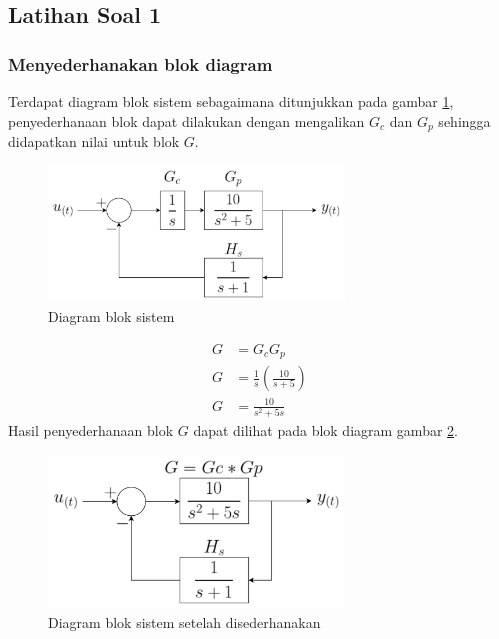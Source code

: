 \documentclass[../cover.tex]{subfiles}
\begin{document}
    \subsection{Latihan Soal 1}
        \subsubsection{Menyederhanakan blok diagram}
        Terdapat diagram blok sistem sebagaimana ditunjukkan pada gambar \ref{gambar_1}, penyederhanaan blok dapat dilakukan dengan mengalikan $G_c$ dan $G_p$ sehingga didapatkan nilai untuk blok $G$.
            \begin{figure}[H]
                \centering
                \includegraphics[width = 0.7\textwidth]{assets/image/blokDiagram.png}
                \caption{Diagram blok sistem}
                \label{gambar_1}
            \end{figure}
            \begin{equation}
                \begin{split}
                    G &= G_c    G_p \\[5pt]
                    G &= \frac{1}{s} \left(\frac{10}{s+5}\right) \\[5pt]
                    G &= \frac{10}{s^2+5s}
                    \label{persamaan_8}
                \end{split}
            \end{equation}
            Hasil penyederhanaan blok $G$ dapat dilihat pada blok diagram gambar \ref{gambar_2}.
            \begin{figure}[H]
                \centering
                \includegraphics[width = 0.7\textwidth]{assets/image/blokDiagram_Simplified.png}
                \caption{Diagram blok sistem setelah disederhanakan}
                \label{gambar_2}
            \end{figure}
\end{document}
